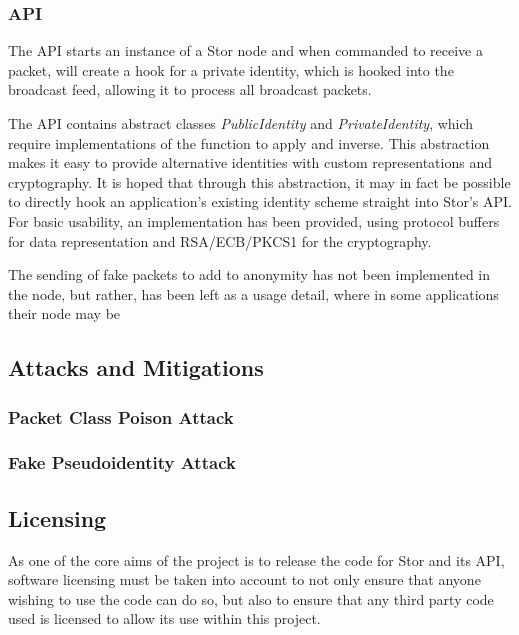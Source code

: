 		\subsubsection*{API}
			The API starts an instance of a Stor node and when commanded to receive a packet, will create a hook for a private identity, which is hooked into the broadcast feed, allowing it to process all broadcast packets.
			
			The API contains abstract classes \textit{PublicIdentity} and \textit{PrivateIdentity}, which require implementations of the function to apply and inverse. This abstraction makes it easy to provide alternative identities with custom representations and cryptography. It is hoped that through this abstraction, it may in fact be possible to directly hook an application's existing identity scheme straight into Stor's API. For basic usability, an implementation has been provided, using protocol buffers for data representation and RSA/ECB/PKCS1 for the cryptography.
			
			The sending of fake packets to add to anonymity has not been implemented in the node, but rather, has been left as a usage detail, where in some applications their node may be
		\subsection{Attacks and Mitigations}
			\subsubsection*{Packet Class Poison Attack}
			\subsubsection*{Fake Pseudoidentity Attack}
		\subsection{Licensing}
			As one of the core aims of the project is to release the code for Stor and its API, software licensing must be taken into account to not only ensure that anyone wishing to use the code can do so, but also to ensure that any third party code used is licensed to allow its use within this project.
